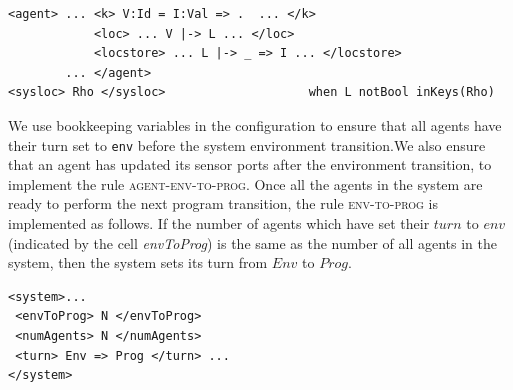 \vspace{2pt}
\begin{mdframed}
\begin{Verbatim}[fontsize=\tiny]
<agent> ... <k> V:Id = I:Val => .  ... </k> 
            <loc> ... V |-> L ... </loc> 
            <locstore> ... L |-> _ => I ... </locstore> 
        ... </agent> 
<sysloc> Rho </sysloc>                    when L notBool inKeys(Rho)        
\end{Verbatim}
\end{mdframed}

We use bookkeeping variables in the \K configuration to ensure that all agents have their turn set to \texttt{env} before the system environment transition.We also  ensure that an agent has updated its sensor ports after the environment transition, to implement the rule \textsc{agent-env-to-prog}. Once all the agents in the system are ready to perform the next program transition, the rule \textsc{env-to-prog} is implemented as follows. If the number of agents which have set their $\mathit{turn}$ to $\mathit{env}$ (indicated by the cell {\em envToProg}) is the same as the number of all agents in the system, then the system sets its turn from $\mathit{Env}$ to $\mathit{Prog}$. 

\vspace{2pt}
\begin{mdframed}
\begin{Verbatim}[fontsize=\tiny]
<system>...
 <envToProg> N </envToProg>
 <numAgents> N </numAgents>  
 <turn> Env => Prog </turn> ... 
</system>                      
\end{Verbatim}
\end{mdframed}

